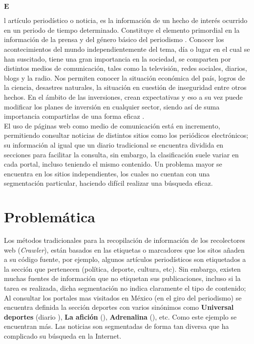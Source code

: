 	








\ \\\\
\begin{Large}$\mathbf{E}$\end{Large}l artículo periodístico o noticia, es la información de un hecho de interés 
  ocurrido en un periodo de tiempo determinado. Constituye el elemento primordial en la información de la prensa y 
  del género básico del periodismo \citep{CU1}. Conocer los acontecimientos del mundo independientemente del tema, día o 
  lugar en el cual se han suscitado, tiene una gran importancia en la sociedad, se comparten por distintos medios de comunicación, 
  tales como la televisión, redes sociales, diarios, blogs y la radio. Nos permiten conocer la situación económica del país, logros 
  de la ciencia, desastres naturales, la situación en cuestión de inseguridad entre otros hechos. En el ámbito de las inversiones, 
  crean expectativas y eso a su vez puede modificar los planes de inversión en cualquier sector, siendo así de suma importancia 
  compartirlas de una forma eficaz \citep{CU2}.\\

El uso de páginas web como medio de comunicación está en incremento, permitiendo consultar noticias de distintos sitios como 
los periódicos electrónicos; su información al igual que un diario tradicional se encuentra dividida en secciones para facilitar 
la consulta, sin embargo, la clasificación suele variar en cada portal, incluso teniendo el mismo contenido. Un problema mayor se 
encuentra en los sitios independientes, los cuales no cuentan con una segmentación particular, haciendo difícil realizar una búsqueda eficaz.\\



\section{Problemática}


Los métodos tradicionales para la recopilación de información de los recolectores web (\textit{Crawler}), están basados en las etiquetas o 
marcadores que los sitos añaden a su código fuente, por ejemplo, algunos artículos periodísticos son etiquetados a la sección que pertenecen 
(política, deporte, cultura, etc). Sin embargo, existen muchas fuentes de información que no etiquetan sus publicaciones, incluso si la tarea 
es realizada, dicha segmentación no indica claramente el tipo de contenido; Al consultar los portales mas visitados en México (en el giro del periodismo) 
se encuentra definida la sección deportes con varios sinónimos como \textbf{Universal deportes} (diario ), \textbf{La afición} 
(), \textbf{Adrenalina} (), etc. Como este ejemplo se encuentran más. Las noticias son segmentadas de forma tan diversa que 
ha complicado su búsqueda en la Internet.\\



